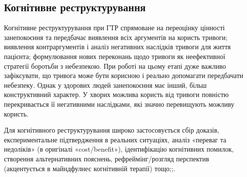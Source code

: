 \documentclass[twocolumn]{article}
\begin{document}
\subsection{Когнітивне реструктурування}
\par Когнітивне реструктурування при ГТР спрямоване на переоцінку цінності занепокоєння та передбачає  виявлення всіх аргументів на користь тривоги; виявлення контраргументів і аналіз негативних наслідків тривоги для життя пацієнта; формулювання нових переконань щодо тривоги як неефективної стратегії боротьби з небезпекою. При роботі на цьому етапі дуже важливо зафіксувати, що тривога може бути корисною і реально допомагати передбачати небезпеку. Однак у здорових людей занепокоєння має інший, більш конструктивний характер. У хворих можлива користь від тривоги повністю перекривається її негативними наслідками, які значно перевищують можливу користь.
\par Для когнітивного реструктурування широко застосовується сбір доказів, експериментальне підтвердження в реальних ситуаціях, аналіз «переваг та недоліків» (в оригіналі «cost/benefit»), ідентифікацію когнітивних помилок, створення альтернативних пояснень, рефреймінг/розгляд перспектив (акцентується в майндфулнес когнітивній терапії) тощо\cite{bib19};\cite{bib20};\cite{bib21}.
\end{document}
